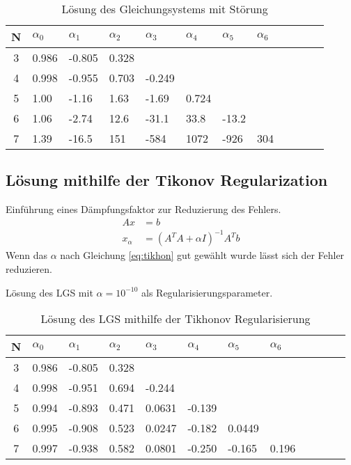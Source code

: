 \documentclass{beamer}
\begin{document}
  \begin{frame}
    \centering    
    \begin{table}[htbp]
    \tiny   
    \renewcommand{\arraystretch}{1.5}
    \begin{tabularx}{\textwidth}{|c|X|X|X|X|X|X|X|X|X|X|X|}
        \hline    
        N & $\alpha_0$&$\alpha_1$&$\alpha_2$&$\alpha_3$&$\alpha_4$&$\alpha_5$&$\alpha_6$ \\\hline
        3 & 0.986 & -0.805 & 0.328 &&&&\\\hline
        4 & 0.998 & -0.955 & 0.703 & -0.249 &&&\\\hline
        5 & 1.00 & -1.16 & 1.63 & -1.69 & 0.724 &&\\\hline
        6 & 1.06 & -2.74 & 12.6 & -31.1 & 33.8 & -13.2 &\\\hline
        7 & 1.39 & -16.5 & 151 & -584 & 1072 & -926 & 304 \\\hline
      
        \end{tabularx}
    \caption{Lösung des Gleichungsystems mit Störung}      
    \end{table}
  \end{frame}
  
  \subsection{Lösung mithilfe der Tikonov Regularization}
  \begin{frame}
    Einführung eines Dämpfungsfaktor zur Reduzierung des Fehlers.
    \begin{align}
      Ax& = b\\
      \label{eq:tikhon}
      x_\alpha &= \left(A^T A+\alpha I\right)^{-1}A^T b
    \end{align}
    Wenn das $\alpha$ nach Gleichung \ref{eq:tikhon} gut gewählt wurde lässt sich
    der Fehler reduzieren.
    \end{frame}
    
    \begin{frame}
    Lösung des LGS mit $\alpha=10^{-10}$ als Regularisierungsparameter.
    \centering    
    \begin{table}[htbp]
    \tiny   
    \renewcommand{\arraystretch}{1.5}
    \begin{tabularx}{\textwidth}{|c|X|X|X|X|X|X|X|X|X|X|X|}
        \hline    
        N & $\alpha_0$&$\alpha_1$&$\alpha_2$&$\alpha_3$&$\alpha_4$&$\alpha_5$&$\alpha_6$ \\\hline
        3 &0.986  &-0.805  &0.328 &&&& \\\hline
        4 &0.998  &-0.951  &0.694 &-0.244 &&& \\\hline
        5 &0.994  &-0.893  &0.471 &0.0631  &-0.139 && \\\hline
        6 &0.995  &-0.908  &0.523 &0.0247  &-0.182  &0.0449 & \\\hline
        7 &0.997  &-0.938  &0.582 &0.0801  &-0.250  &-0.165  &0.196  \\\hline
        \end{tabularx}
    \caption{Lösung des LGS mithilfe der Tikhonov Regularisierung}      
    \end{table}
  \end{frame}
\end{document}
